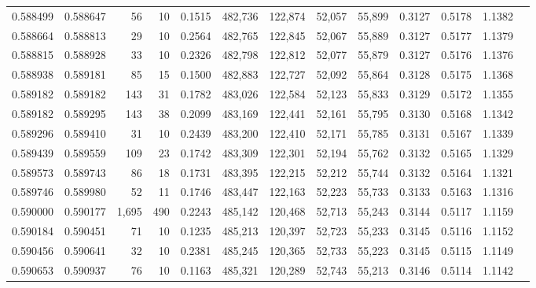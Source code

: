 \begin{tabular}{rrrrrrrrrrrrr}
0.588499 & 0.588647 &    56 &  10 &                                     0.1515 & 482,736 & 122,874 &  52,057 &  55,899 & 0.3127 & 0.5178 & 1.1382 \\
0.588664 & 0.588813 &    29 &  10 &                                     0.2564 & 482,765 & 122,845 &  52,067 &  55,889 & 0.3127 & 0.5177 & 1.1379 \\
0.588815 & 0.588928 &    33 &  10 &                                     0.2326 & 482,798 & 122,812 &  52,077 &  55,879 & 0.3127 & 0.5176 & 1.1376 \\
0.588938 & 0.589181 &    85 &  15 &                                     0.1500 & 482,883 & 122,727 &  52,092 &  55,864 & 0.3128 & 0.5175 & 1.1368 \\
0.589182 & 0.589182 &   143 &  31 &                                     0.1782 & 483,026 & 122,584 &  52,123 &  55,833 & 0.3129 & 0.5172 & 1.1355 \\
0.589182 & 0.589295 &   143 &  38 &                                     0.2099 & 483,169 & 122,441 &  52,161 &  55,795 & 0.3130 & 0.5168 & 1.1342 \\
0.589296 & 0.589410 &    31 &  10 &                                     0.2439 & 483,200 & 122,410 &  52,171 &  55,785 & 0.3131 & 0.5167 & 1.1339 \\
0.589439 & 0.589559 &   109 &  23 &                                     0.1742 & 483,309 & 122,301 &  52,194 &  55,762 & 0.3132 & 0.5165 & 1.1329 \\
0.589573 & 0.589743 &    86 &  18 &                                     0.1731 & 483,395 & 122,215 &  52,212 &  55,744 & 0.3132 & 0.5164 & 1.1321 \\
0.589746 & 0.589980 &    52 &  11 &                                     0.1746 & 483,447 & 122,163 &  52,223 &  55,733 & 0.3133 & 0.5163 & 1.1316 \\
0.590000 & 0.590177 & 1,695 & 490 &                                     0.2243 & 485,142 & 120,468 &  52,713 &  55,243 & 0.3144 & 0.5117 & 1.1159 \\
0.590184 & 0.590451 &    71 &  10 &                                     0.1235 & 485,213 & 120,397 &  52,723 &  55,233 & 0.3145 & 0.5116 & 1.1152 \\
0.590456 & 0.590641 &    32 &  10 &                                     0.2381 & 485,245 & 120,365 &  52,733 &  55,223 & 0.3145 & 0.5115 & 1.1149 \\
0.590653 & 0.590937 &    76 &  10 &                                     0.1163 & 485,321 & 120,289 &  52,743 &  55,213 & 0.3146 & 0.5114 & 1.1142 \\

\end{tabular}
